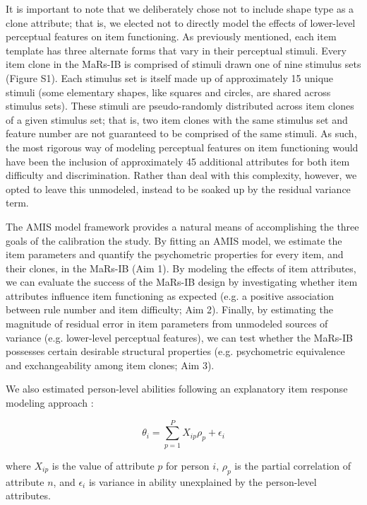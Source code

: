 \documentclass[a4paper,man,natbib]{apa6}
\begin{document}
It is important to note that we deliberately chose not to include shape type as a clone attribute; that is, we elected not to directly model the effects of lower-level perceptual features on item functioning. As previously mentioned, each item template has three alternate forms that vary in their perceptual stimuli. Every item clone in the MaRs-IB is comprised of stimuli drawn one of nine stimulus sets (Figure S1). Each stimulus set is itself made up of approximately 15 unique stimuli (some elementary shapes, like squares and circles, are shared across stimulus sets). These stimuli are pseudo-randomly distributed across item clones of a given stimulus set; that is, two item clones with the same stimulus set and feature number are not guaranteed to be comprised of the same stimuli. As such, the most rigorous way of modeling perceptual features on item functioning would have been the inclusion of approximately 45 additional attributes for both item difficulty and discrimination. Rather than deal with this complexity, however, we opted to leave this unmodeled, instead to be soaked up by the residual variance term. 

The AMIS model framework provides a natural means of accomplishing the three goals of the calibration the study. By fitting an AMIS model, we estimate the item parameters and quantify the psychometric properties for every item, and their clones, in the MaRs-IB (Aim 1). By modeling the effects of item attributes, we can evaluate the success of the MaRs-IB design by investigating whether item attributes influence item functioning as expected (e.g. a positive association between rule number and item difficulty; Aim 2). Finally, by estimating the magnitude of residual error in item parameters from unmodeled sources of variance (e.g. lower-level perceptual features), we can test whether the MaRs-IB possesses certain desirable structural properties (e.g. psychometric equivalence and exchangeability among item clones; Aim 3). 

We also estimated person-level abilities following an explanatory item response modeling approach \citep{wilson2008explanatory}: 

\begin{equation} \label{eq:4}
\theta_i = \sum_{p=1}^P X_{ip} \rho_p + \epsilon_i    
\end{equation}

\noindent where $X_{ip}$ is the value of attribute $p$ for person $i$, $\rho_p$ is the partial correlation of attribute $n$, and $\epsilon_i$ is variance in ability unexplained by the person-level attributes. 
\end{document}
